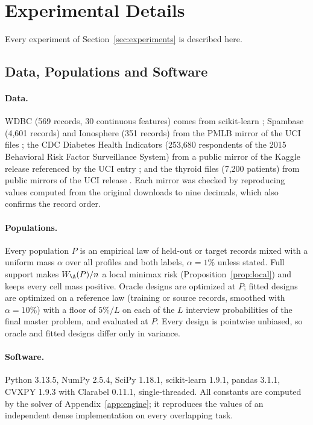 \section{Experimental Details}\label{app:F}
Every experiment of Section~\ref{sec:experiments} is described here.

\subsection{Data, Populations and Software}\label{app:capsens}
\paragraph{Data.}
WDBC (569 records, 30 continuous features) comes from scikit-learn \citep{wolberg1993}; Spambase (4,601 records) and Ionosphere (351 records) from the PMLB mirror of the UCI files \citep{spambase1999,ionosphere1989,romano2021pmlb}; the CDC Diabetes Health Indicators (253,680 respondents of the 2015 Behavioral Risk Factor Surveillance System) from a public mirror of the Kaggle release referenced by the UCI entry \citep{cdcdiabetes2017}; and the thyroid files (7,200 patients) from public mirrors of the UCI release \citep{quinlan1986thyroid}. Each mirror was checked by reproducing values computed from the original downloads to nine decimals, which also confirms the record order.

\paragraph{Populations.}
Every population $P$ is an empirical law of held-out or target records mixed with a uniform mass $\alpha$ over all profiles and both labels, $\alpha=1\%$ unless stated. Full support makes $W_\A(P)/n$ a local minimax risk (Proposition~\ref{prop:local}) and keeps every cell mass positive. Oracle designs are optimized at $P$; fitted designs are optimized on a reference law (training or source records, smoothed with $\alpha=10\%$) with a floor of $5\%/L$ on each of the $L$ interview probabilities of the final master problem, and evaluated at $P$. Every design is pointwise unbiased, so oracle and fitted designs differ only in variance.

\paragraph{Software.}
Python 3.13.5, NumPy 2.5.4, SciPy 1.18.1, scikit-learn 1.9.1, pandas 3.1.1, CVXPY 1.9.3 with Clarabel 0.11.1, single-threaded. All constants are computed by the solver of Appendix~\ref{app:engine}; it reproduces the values of an independent dense implementation on every overlapping task.

